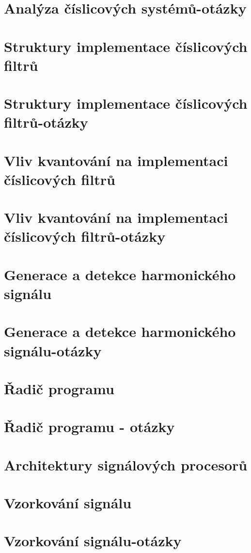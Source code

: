 \documentclass[10pt, a4paper]{article}%
\begin{document}
\section{Analýza číslicových systémů-otázky}

\section{Struktury implementace číslicových filtrů}

\section{Struktury implementace číslicových filtrů-otázky}

\section{Vliv kvantování na implementaci číslicových filtrů}

\section{Vliv kvantování na implementaci číslicových filtrů-otázky}

\section{Generace a detekce harmonického signálu}

\section{Generace a detekce harmonického signálu-otázky}

\section{Řadič programu}

\section{Řadič programu - otázky}

\section{Architektury signálových procesorů}

\section{Vzorkování signálu}

\section{Vzorkování signálu-otázky}

\end{document}
